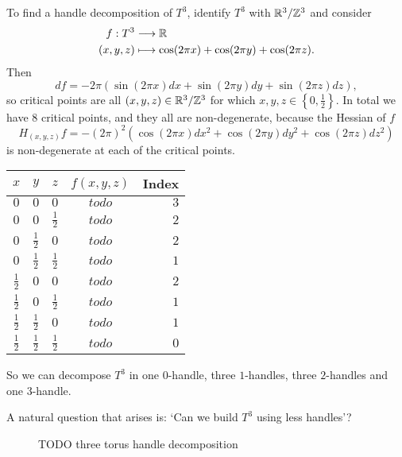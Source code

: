 \begin{eg}
\end{eg}
\begin{eg}[$T^{3} = S^{1} \times S^{1} \times S^{2}$]
    \label{eg:handle-decomposition-three-torus}
    To find a handle decomposition of $T^3$, identify $T^{3}$ with $\mathbb{R}^3 / \mathbb{Z}^{3}$ and consider
    \begin{align*}
        f: T^{3} &\longrightarrow \mathbb{R} \\
        (x, y, z) &\longmapsto \cos (2 \pi x) + \cos ( 2 \pi y) + \cos(2 \pi z)
    .\end{align*}
    Then
    \[
        df = -2\pi (\sin (2 \pi x) dx+ \sin ( 2 \pi y) dy + \sin(2 \pi z) dz)
    ,\] 
    so critical points are all $(x, y, z) \in \mathbb{R}^3 / \mathbb{Z}^3$ for which  $x, y, z \in \left\{0, \frac{1}{2}\right\}$.
    In total we have $8$ critical points, and they all are non-degenerate, because the Hessian of $f$
    \[
        H_{(x, y, z)} f = - (2 \pi)^2  (\cos (2 \pi x) dx^2 + \cos ( 2 \pi y) dy^2 + \cos(2 \pi z) dz^2)
    \] 
    is non-degenerate at each of the critical points.

    \begin{tabular}{ccccr}
        $x$ & $y$ & $z$ & $f(x, y, z)$ &  Index\\ \hline
        $0$ & $0$ & $0$ & $todo$ & $3$ \\
        $0$ & $0$ & $\frac{1}{2}$ & $todo$ & $2$ \\
        $0$ & $\frac{1}{2}$ & $0$ & $todo$ & $2$ \\
        $0$ & $\frac{1}{2}$ & $\frac{1}{2}$ & $todo$ & $1$ \\
        $\frac{1}{2}$ & $0$ & $0$ & $todo$ & $2$ \\
        $\frac{1}{2}$ & $0$ & $\frac{1}{2}$ & $todo$ & $1$ \\
        $\frac{1}{2}$ & $\frac{1}{2}$ & $0$ & $todo$ & $1$ \\
        $\frac{1}{2}$ & $\frac{1}{2}$ & $\frac{1}{2}$ & $todo$ & $0$ \\
    \end{tabular}

    So we can decompose $T^3$ in one $0$-handle, three $1$-handles, three $2$-handles and one $3$-handle.

    A natural question that arises is: `Can we build $T^{3}$ using less handles'?


    \begin{figure}[H]
    \centering
    \caption{TODO three torus handle decomposition}
    \label{fig:three-torus-handle-decomposition}
\end{figure}
\end{eg}



